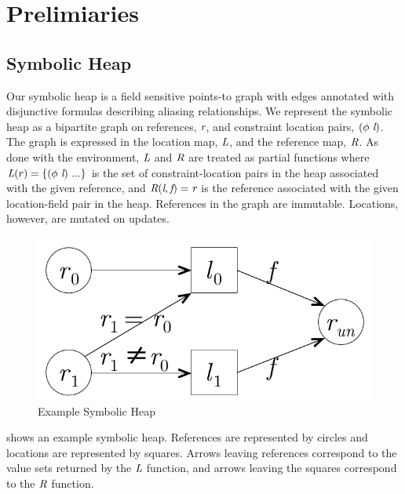 \section{Prelimiaries}
\label{sec:sh}

\subsection{Symbolic Heap}

Our symbolic heap is a field sensitive points-to graph with edges
annotated with disjunctive formulas describing aliasing
relationships. We represent the symbolic heap as a bipartite graph on
references, $\emph{r}$, and constraint location pairs,
$(\phi\ \emph{l})$. The graph is expressed in the location map,
$\emph{L}$, and the reference map, $\emph{R}$. As done with the
environment, $\emph{L}$ and $\emph{R}$ are treated as partial
functions where $\cfgnt{L}(r) = \{(\phi\ \cfgnt{l})\ ...\}$ is the set
of constraint-location pairs in the heap associated with the given
reference, and $\emph{R}(\emph{l},\emph{f}) = \emph{r}$ is the
reference associated with the given location-field pair in the
heap. References in the graph are immutable. Locations, however, are
mutated on updates.

\begin{figure}[t]
\begin{center}
\includegraphics[scale=0.5]{../figs/simple_heap_scratch.pdf}
\end{center}
\caption{Example Symbolic Heap}
\label{fig:exampleHeap}
\end{figure}

 shows an example symbolic heap. References are 
represented by circles and locations are represented by squares. Arrows leaving
references correspond to the value sets returned by the $\emph{L}$ function, and 
arrows leaving the squares correspond to the $\emph{R}$ function.

